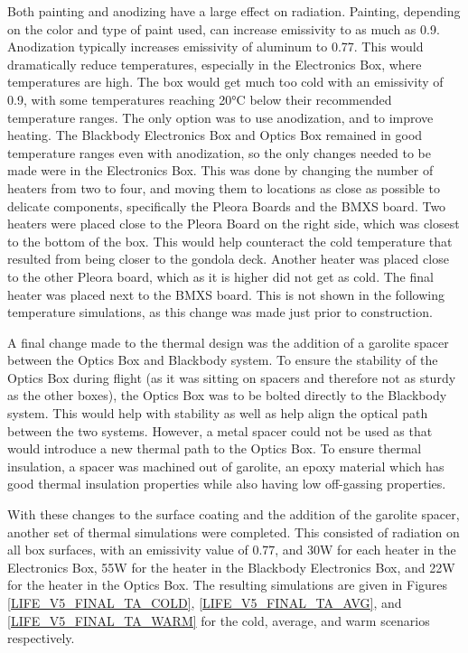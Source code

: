 Both painting and anodizing have a large effect on radiation. Painting, depending on the color and type of paint used, can increase emissivity to as much as 0.9. Anodization typically increases emissivity of aluminum to 0.77. This would dramatically reduce temperatures, especially in the Electronics Box, where temperatures are high. The box would get much too cold with an emissivity of 0.9, with some temperatures reaching 20°C below their recommended temperature ranges. The only option was to use anodization, and to improve heating. The Blackbody Electronics Box and Optics Box remained in good temperature ranges even with anodization, so the only changes needed to be made were in the Electronics Box. This was done by changing the number of heaters from two to four, and moving them to locations as close as possible to delicate components, specifically the Pleora Boards and the BMXS board. Two heaters were placed close to the Pleora Board on the right side, which was closest to the bottom of the box. This would help counteract the cold temperature that resulted from being closer to the gondola deck. Another heater was placed close to the other Pleora board, which as it is higher did not get as cold. The final heater was placed next to the BMXS board. This is not shown in the following temperature simulations, as this change was made just prior to construction.

A final change made to the thermal design was the addition of a garolite spacer between the Optics Box and Blackbody system. To ensure the stability of the Optics Box during flight (as it was sitting on spacers and therefore not as sturdy as the other boxes), the Optics Box was to be bolted directly to the Blackbody system. This would help with stability as well as help align the optical path between the two systems. However, a metal spacer could not be used as that would introduce a new thermal path to the Optics Box. To ensure thermal insulation, a spacer was machined out of garolite, an epoxy material which has good thermal insulation properties while also having low off-gassing properties.

With these changes to the surface coating and the addition of the garolite spacer, another set of thermal simulations were completed. This consisted of radiation on all box surfaces, with an emissivity value of 0.77, and 30W for each heater in the Electronics Box, 55W for the heater in the Blackbody Electronics Box, and 22W for the heater in the Optics Box. The resulting simulations are given in Figures \ref{LIFE_V5_FINAL_TA_COLD}, \ref{LIFE_V5_FINAL_TA_AVG}, and \ref{LIFE_V5_FINAL_TA_WARM} for the cold, average, and warm scenarios respectively. 


